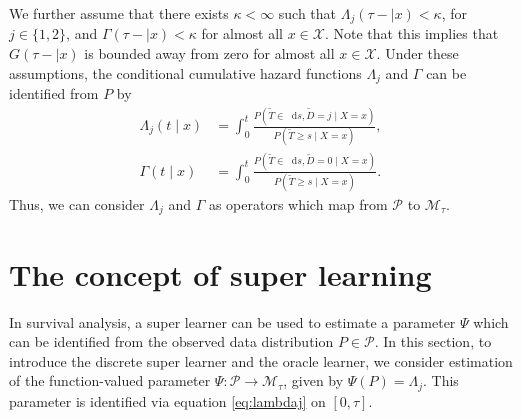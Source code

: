 \documentclass[numsec,webpdf,contemporary,medium,namedate]{oup-authoring-template}%
\theoremstyle{thmstyleone}%
\theoremstyle{thmstyletwo}%
\theoremstyle{thmstylethree}%
\newcommand*\diff{\mathop{}\!\mathrm{d}}
\newcommand{\1}{\mathds{1}}
\begin{document}
We further assume that there exists \(\kappa<\infty\) such that
\(\Lambda_{j}(\tau- \mid x)<\kappa \), for \(j\in\{1,2\}\), and
\(\Gamma(\tau- \mid x)<\kappa\) for almost all \(x\in\mathcal X\). Note that this
implies that \(G(\tau- \mid x)\) is bounded away from zero for almost all \(x\in\mathcal X\).
Under these assumptions, the conditional cumulative hazard functions
\(\Lambda_{j}\) and \(\Gamma\) can be identified from \(P\) by
\begin{align}
  \Lambda_{j}(t \mid x) &= \int_0^t\frac{  P(\tilde T \in \diff s, \tilde D=j \mid X=x )}{P(\tilde T \geq s \mid X=x )}, \label{eq:lambdaj}\\
  \Gamma(t \mid x) &= \int_0^t\frac{  P(\tilde T \in \diff s, \tilde D=0 \mid X=x )}{P(\tilde T \geq s \mid X=x )}\label{eq:gamma}.
\end{align}
Thus, we can consider $\Lambda_j$ and \(\Gamma\) as operators which map from
\( \mathcal{P} \) to \(\mathcal M_{\tau}\).

 
\section{The concept of super learning}
\label{sec:super-learning}

In survival analysis, a super learner can be used to estimate a
parameter $\Psi$ which can be identified from the observed data
distribution \(P\in\mathcal P\). In this section, to introduce the
discrete super learner and the oracle learner, we consider estimation of the
function-valued parameter \(\Psi:\mathcal P\to\mathcal M_{\tau}\), given by
\(\Psi(P)=\Lambda_j\). This parameter is identified via equation
\eqref{eq:lambdaj} on \([0,\tau]\).
\end{document}
